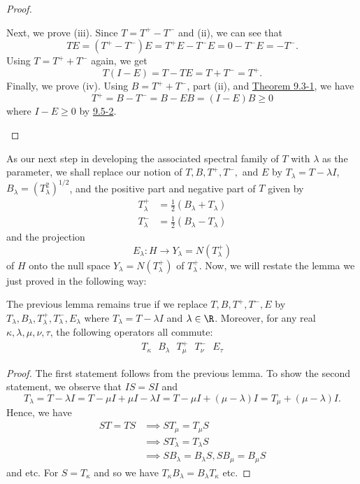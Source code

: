 \begin{proof}
\begin{enumerate}
            Next, we prove (iii). Since \( T = T^{+ } - T^{-} \) and (ii), we can see that   
            \[  TE = (T^{+} - T^{-}) E = T^{+}E - T^{-}E = 0 - T^{-} E = -T^{-}.   \]
            Using \( T=  T^{+ } + T^{-} \) again, we get
            \[  T(I - E ) = T - T E = T + T^{-} = T^{+}. \]
            Finally, we prove (iv). Using \( B = T^{+ } + T^{-} \), part (ii), and {\hyperref[9.3-1]{Theorem 9.3-1}}, we have  
            \[  T^{+} = B - T^{-} = B - EB = (I - E) B \geq 0  \]
            where \( I - E \geq 0  \) by {\hyperref[9.5-2]{9.5-2}}.
\end{enumerate}
\end{proof}

As our next step in developing the associated spectral family of \( T  \) with \( \lambda  \) as the parameter, we shall replace our notion of \( T, B , T^{+}, T^{-} ,   \) and \( E  \) by \( {T}_{\lambda} = T - \lambda I  \), \( {B}_{\lambda} = ({T}_{\lambda}^{2})^{1/2}  \), and the positive part and negative part of \( T  \) given by
\begin{align*}
    {T}_{\lambda}^{+} &= \frac{ 1 }{ 2 }  ({B}_{\lambda} + {T}_{\lambda}) \\
    {T}_{\lambda}^{-} &= \frac{ 1 }{ 2 }  ({B}_{\lambda} - {T}_{\lambda})
\end{align*}
and the projection
\[  {E}_{\lambda} : H \to {Y}_{\lambda} = N({T}_{\lambda}^{+}) \]
of \( H \) onto the null space \( {Y}_{\lambda} = N({T}_{\lambda}^{+}) \) of \( {T}_{\lambda}^{+} \). Now, we will restate the lemma we just proved in the following way: 

\begin{lemma}\label{9.8-2}
   The previous lemma remains true if we replace \( T, B , T^{+}, T^{-}, E  \) by \( {T}_{\lambda}, {B}_{\lambda}, {T}_{\lambda}^{+}, {T}_{\lambda}^{-}, {E}_{\lambda} \) where \( {T}_{\lambda} = T - \lambda I  \) and \( \lambda \in \R  \). Moreover, for any real \( \kappa, \lambda , \mu, \nu, \tau  \), the following operators all commute:
   \begin{align*}  {T}_{\kappa} \ \ \   {B}_{\lambda} \ \ \  {T}_{\mu}^{+} \ \ \  {T}_{\nu}^{-} \ \ \   {E}_{\tau}   \end{align*}
\end{lemma}
\begin{proof}
The first statement follows from the previous lemma. To show the second statement, we observe that \( IS = SI  \) and 
\[  {T}_{\lambda} = T - \lambda I  = T - \mu I + \mu I - \lambda I  = T - \mu I + (\mu - \lambda)I  = {T}_{\mu} + (\mu - \lambda) I. \]
Hence, we have 
\begin{align*}
    ST = TS &\implies S {T}_{\mu } = {T}_{\mu } S   \\
            &\implies S  {T}_{\lambda} = {T}_{\lambda} S  \\
            &\implies S {B}_{\lambda} = {B}_{\lambda} S, S {B}_{\mu } = {B}_{\mu } S  
\end{align*}
and etc. For \( S = {T}_{\kappa} \) and so we have \( {T}_{\kappa} {B}_{\lambda} = {B}_{\lambda} {T}_{\kappa}   \) etc.
\end{proof}

